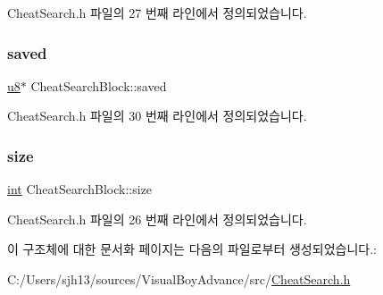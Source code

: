 Cheat\+Search.\+h 파일의 27 번째 라인에서 정의되었습니다.

\mbox{\label{struct_cheat_search_block_af2b921cffd3f8d9420a8b9a3a33752ca}} 
\subsubsection{\texorpdfstring{saved}{saved}}
{\footnotesize\ttfamily \mbox{\hyperlink{_system_8h_aed742c436da53c1080638ce6ef7d13de}{u8}}$\ast$ Cheat\+Search\+Block\+::saved}



Cheat\+Search.\+h 파일의 30 번째 라인에서 정의되었습니다.

\mbox{\label{struct_cheat_search_block_aaaf9517229363e8807cd511022d90012}} 
\subsubsection{\texorpdfstring{size}{size}}
{\footnotesize\ttfamily \mbox{\hyperlink{_util_8cpp_a0ef32aa8672df19503a49fab2d0c8071}{int}} Cheat\+Search\+Block\+::size}



Cheat\+Search.\+h 파일의 26 번째 라인에서 정의되었습니다.



이 구조체에 대한 문서화 페이지는 다음의 파일로부터 생성되었습니다.\+:\begin{DoxyCompactItemize}
\item 
C\+:/\+Users/sjh13/sources/\+Visual\+Boy\+Advance/src/\mbox{\hyperlink{_cheat_search_8h}{Cheat\+Search.\+h}}\end{DoxyCompactItemize}
